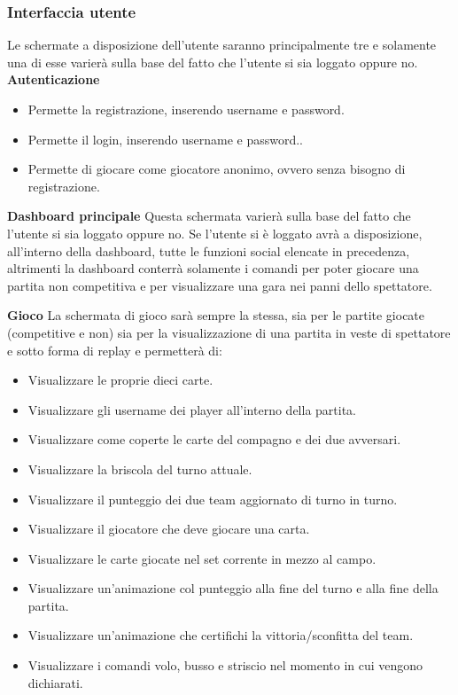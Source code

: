            \clearpage
           \subsubsection[Interfaccia Utente ]{\large {Interfaccia utente}\label{subsub:requirements:genericGui}}
           Le schermate a disposizione dell'utente saranno principalmente tre e solamente una di esse varierà sulla base del fatto che l'utente si sia loggato oppure no.
           \bigbreak
           \textbf{Autenticazione}
           \begin {itemize}
           \item Permette la registrazione, inserendo username e password.
           \item Permette il login, inserendo username e password..
           \item Permette di giocare come giocatore anonimo, ovvero senza bisogno di registrazione.
           \end {itemize}

           \bigbreak
           \textbf {Dashboard principale}
           \bigbreak
           Questa schermata varierà sulla base del fatto che l'utente si sia loggato oppure no. Se l'utente si è loggato avrà a disposizione, all'interno della dashboard, tutte le funzioni social elencate in precedenza, altrimenti la dashboard conterrà solamente i comandi per poter giocare una partita non competitiva e per visualizzare una gara nei panni dello spettatore.

           \bigbreak
           \textbf{Gioco}
           \bigbreak
           La schermata di gioco sarà sempre la stessa, sia per le partite giocate (competitive e non) sia per la visualizzazione di una partita in veste di spettatore e sotto forma di replay e permetterà di:
           \begin {itemize}
           \item Visualizzare le proprie dieci carte.
           \item Visualizzare gli username dei player all'interno della partita.
           \item Visualizzare come coperte le carte del compagno e dei due avversari.
           \item Visualizzare la briscola del turno attuale.
           \item Visualizzare il punteggio dei due team aggiornato di turno in turno.
           \item Visualizzare il giocatore che deve giocare una carta.
           \item Visualizzare le carte giocate nel set corrente in mezzo al campo.
           \item Visualizzare un'animazione col punteggio alla fine del turno e alla fine della partita.
           \item Visualizzare un'animazione che certifichi la vittoria/sconfitta del team.
           \item Visualizzare i comandi volo, busso e striscio nel momento in cui vengono dichiarati.
           \end {itemize}

